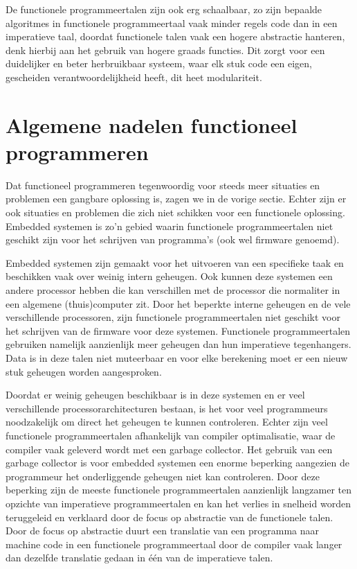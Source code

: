 \documentclass[twoside,twocolumn]{article}
\begin{document}
De functionele programmeertalen zijn ook erg schaalbaar, zo zijn bepaalde
algoritmes in functionele programmeertaal vaak minder regels code dan in een
imperatieve taal, doordat functionele talen vaak een hogere abstractie
hanteren, denk hierbij aan het gebruik van hogere graads functies. Dit zorgt
voor een duidelijker en beter herbruikbaar systeem, waar elk stuk code een
eigen, gescheiden verantwoordelijkheid heeft, dit heet modulariteit.


\section{Algemene nadelen functioneel programmeren}
Dat functioneel programmeren tegenwoordig voor steeds meer situaties en
problemen een gangbare oplossing is, zagen we in de vorige sectie. Echter zijn
er ook situaties en problemen die zich niet schikken voor een functionele
oplossing. Embedded systemen is zo'n gebied waarin functionele programmeertalen
niet geschikt zijn voor het schrijven van programma's
(ook wel firmware genoemd).

Embedded systemen zijn gemaakt voor het uitvoeren van een specifieke taak
en beschikken vaak over weinig intern geheugen. Ook kunnen deze systemen een
andere processor hebben die kan verschillen met de processor die normaliter in
een algemene (thuis)computer zit. Door het beperkte interne geheugen en de vele
verschillende processoren, zijn functionele programmeertalen niet geschikt
voor het schrijven van de firmware voor deze systemen. Functionele
programmeertalen gebruiken namelijk aanzienlijk meer geheugen dan hun
imperatieve tegenhangers. Data is in deze talen niet muteerbaar en voor elke
berekening moet er een nieuw stuk geheugen worden aangesproken.

Doordat er weinig geheugen beschikbaar is in deze systemen en er veel
verschillende processorarchitecturen bestaan, is het voor veel programmeurs
noodzakelijk om direct het geheugen te kunnen controleren. Echter zijn veel
functionele programmeertalen afhankelijk van compiler optimalisatie, waar de
compiler vaak geleverd wordt met een garbage collector. Het gebruik van een
garbage collector is voor embedded systemen een enorme beperking aangezien de
programmeur het onderliggende geheugen niet kan controleren. Door deze
beperking zijn de meeste functionele programmeertalen aanzienlijk langzamer ten
opzichte van imperatieve programmeertalen en kan het verlies in snelheid worden
teruggeleid en verklaard door de focus op abstractie van de functionele talen.
Door de focus op abstractie duurt een translatie van een programma naar machine
code in een functionele programmeertaal door de compiler vaak langer dan
dezelfde translatie gedaan in \'e\'en van de imperatieve talen.
\end{document}
